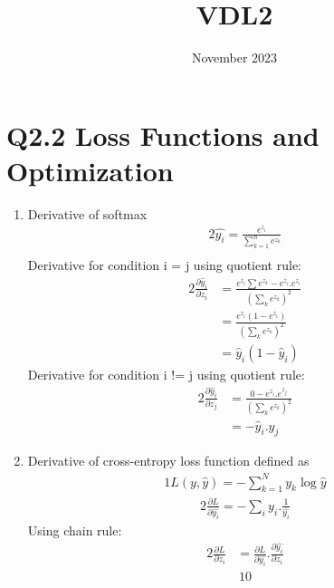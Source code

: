 
\usepackage{enumerate}
\usepackage{amsmath}
\title{VDL2}
\date{November 2023}



\maketitle

\section*{Q2.2 Loss Functions and Optimization}
\begin{enumerate}[i]
    \item Derivative of softmax
    \begin{alignat}{2}
        \hat{y_i}=\frac{e^{z_i}}{\sum_{k=1}^n e^{z_k}}
        \\
    \end{alignat}
    Derivative for condition i = j  using quotient rule:
    \begin{alignat}{2}
        \frac{\partial{\hat{y}_i}}{\partial{z}_i} &= \frac{e^{z_i}\sum e^{z_k} - e^{z_i} . e^{z_i}}{(\sum_k e^{z_k})^2}
        \\
        &= \frac{e^{z_i} (1 - e^{z_i})}{(\sum_k e^{z_k})^2}
        \\
        &= \hat y_i (1-\hat y_i)
    \end{alignat}
    Derivative for condition i != j  using quotient rule:
    \begin{alignat}{2}
        \frac{\partial{\hat{y}_i}}{\partial{z}_j} &= \frac{0- e^{z_i}.e^{z_j}}{(\sum_k e^{z_k})^2}
        \\
        &= -\hat{y}_i.\hat{y}_j
    \end{alignat}
    \item Derivative of cross-entropy loss function defined as
    \begin{alignat}{1}
        L(y, \hat{y}) = - \sum_{k=1}^N y_k \log\hat{y}
    \end{alignat}
    \begin{alignat}{2}
        \frac{\partial L}{\partial \hat{y_i}} = - \sum_i y_i . \frac{1}{\hat{y_i}}
    \end{alignat}
    Using chain rule:
    \begin{alignat}{2}
        \frac{\partial L}{\partial z_i} &= \frac{\partial L}{\partial \hat{y_i}} . \frac{\partial \hat{y_i}}{\partial z_i}
    \end{alignat}
    \begin{alignat}{10}

\end{alignat}
\end{enumerate}
